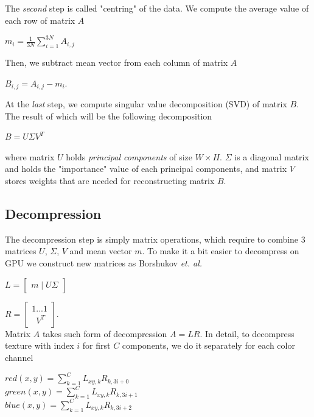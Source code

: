 The  \emph{second} step is called "centring" of the data. We compute the average value of each row of matrix $A$

{\centering $m_i=\frac{1}{3N}\sum_{i=1}^{3N}A_{i,j}$ \\}

Then, we subtract mean vector from each column of matrix $A$

{\centering $B_{i,j}=A_{i,j}-m_i.$ \\}

At the \emph{last} step, we compute singular value decomposition (SVD) of matrix $B$. The result of which will be the following decomposition

{\centering $B=U\Sigma V^{T}$ \\}

where matrix $U$ holds \emph{principal components} of size $W\times H$. $\Sigma$ is a diagonal matrix and holds the "importance" value of each principal components, and
matrix $V$ stores weights that are needed for reconstructing matrix $B$.

\subsection{Decompression}
\label{section:decompression}
The decompression step is simply matrix operations, which require to combine 3 matrices $U$, $\Sigma$, $V$ and mean vector $m$.
To make it a bit easier to decompress on GPU we construct new matrices as Borshukov  \emph{et. al.}

{\centering $L=\begin{bmatrix}
 m\mid U \Sigma
\end{bmatrix}$ \\}

{\centering $
R=\begin{bmatrix}
 1 ... 1   \\ 
  \, \, \, V^{T}
\end{bmatrix}.$ \\}
  Matrix $A$ takes such form of decompression $A=LR$. In detail, to decompress texture with index $i$ for first $C$ components, we do it separately for each color channel


{\centering $red(x,y)=\sum_{k=1}^{C}L_{xy,k}R_{k,3i+0}$ \\}
{\centering $green(x,y)=\sum_{k=1}^{C}L_{xy,k}R_{k,3i+1}$ \\}
{\centering $blue(x,y)=\sum_{k=1}^{C}L_{xy,k}R_{k,3i+2}$ \\}


